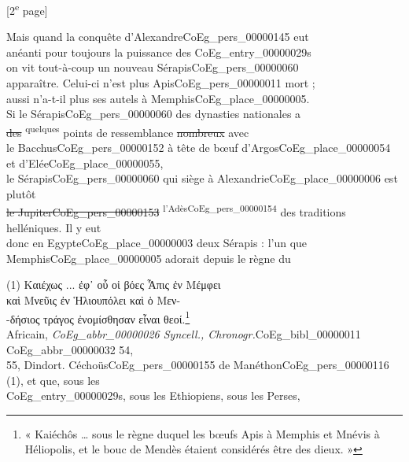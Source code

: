 \documentclass{book}
\begin{document}
{{\footnotesize\begin{center} {[2\textsuperscript{e} page]}\end{center}}

\begin{paracol}{2}
\switchcolumn
Mais quand la conquête d’Alexandre\gls{CoEg_pers_00000145} eut\\
anéanti pour toujours la puissance des \Glspl{CoEg_entry_00000029}\\
on vit tout-à-coup un nouveau Sérapis\gls{CoEg_pers_00000060}\\
apparaître. Celui-ci n’est plus Apis\gls{CoEg_pers_00000011} mort ;\\
aussi n’a-t-il plus ses autels à Memphis\gls{CoEg_place_00000005}.\\
Si le Sérapis\gls{CoEg_pers_00000060} des dynasties nationales a\\
\sout{des} \textsuperscript{quelques} points de ressemblance \sout{nombreux} avec\\
le Bacchus\gls{CoEg_pers_00000152} à tête de bœuf d’Argos\gls{CoEg_place_00000054} et d’Elée\gls{CoEg_place_00000055},\\
le Sérapis\gls{CoEg_pers_00000060} qui siège à Alexandrie\gls{CoEg_place_00000006} est plutôt\\
\sout{le Jupiter\gls{CoEg_pers_00000153}} \textsuperscript{l’Adès\gls{CoEg_pers_00000154}} des traditions helléniques. Il y eut\\
donc en Egypte\gls{CoEg_place_00000003} deux Sérapis : l’un que\\
Memphis\gls{CoEg_place_00000005} adorait depuis le règne du
\end{paracol}
\begin{paracol}{2}
\noindent (1) \foreignlanguage{greek}{Καιέχως ... ἐφ᾿ οὗ οἱ βόες Ἆπις ἐν Μέμφει\\
καὶ Μνεῦις ἐν Ἡλιουπόλει καὶ ὁ Μεν-\\
-δήσιος τράγος ἐνομίσθησαν εἶναι θεοί}.\footnote{« Kaiéchôs … sous le règne duquel les bœufs Apis à Memphis et Mnévis à Héliopolis, et le bouc de Mendès étaient considérés être des dieux. »}\\
Africain, \textit{\gls{CoEg_abbr_00000026} Syncell., Chronogr.}\gls{CoEg_bibl_00000011} \gls{CoEg_abbr_00000032} 54,\\
55, Dindort.
\switchcolumn
\noindent Céchoüs\gls{CoEg_pers_00000155} de Manéthon\gls{CoEg_pers_00000116} (1), et que, sous les\\
\Glspl{CoEg_entry_00000029}, sous les Ethiopiens, sous les Perses,\\

\end{paracol}}
\end{document}
